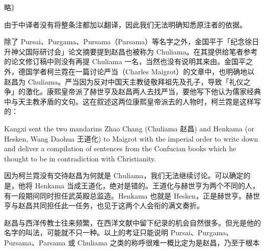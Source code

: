 \vfill
\begin{BookNotes}
\end{BookNotes}

\begin{BookQuote}
略〕
\end{BookQuote}

由于中译者没有将整条注都加以翻译，因此我们无法明确知悉原注者的依据。

除了 Pursai、Purgama、Pursama（Parsama）等名字之外，金国平于「纪念徐日升神父国际研讨会」论文摘要提到赵昌也被称为 Chuliama。在其提供给笔者参考的论文修订稿中则没有再提 Chuliama 一名，当然也没有说明其来由。金国平之外，德国学者柯兰霓在一篇讨论严当（Charles Maigrot）的文章中，也明确地以赵昌为 Chuliama。严当因为反对中国天主教徒敬拜祖先及孔子，导致「礼仪之争」的激化。康熙皇帝派了赫世亨及赵昌两人去找严当，要他写下他认为儒家经典中与天主教矛盾的文句。这在叙述这两位康熙皇帝派去的人物时，柯兰霓是这样写的：

\begin{BookQuote}
Kangxi sent the two mandarins Zhao Chang (Chuliama 赵昌) and Henkama (or Hesken, Wang Daohua 王道化) to Maigrot with the imperial order to write down and deliver a compilation of sentences from the Confucian books which he thought to be in contradiction with Christianity.
\end{BookQuote}

因为柯兰霓没有交待赵昌为何就是 Chuliama，我们无法继续讨论。可以确定的是，他将 Henkama 当成王道化，绝对是错的。王道化与赫世亨为两个不同的人，有一段期间同时担任武英殿总监造。Henkama 也就是 Hesken，正是赫世亨。赫世亨与赵昌共同担任此一任务，也见于这两个人会衔的满文奏折。

赵昌与西洋传教士往来频繁，在西洋文献中留下纪录的机会自然很多。但光是他的名字的叫法，可能就不只一种。以上的考证只能说明 Pursai、Purgama、Pursama、Parsama 或 Chuliama 之类的称呼很难一概比定为是赵昌，乃至于根本

